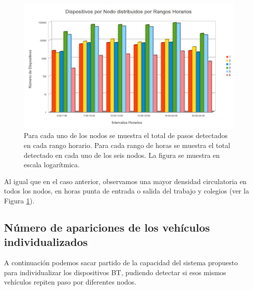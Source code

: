 \documentclass[twocolumn,twoside]{Jornadas}
\begin{document}
 \begin{figure}[htb]
 \begin{center}
 \includegraphics[scale=0.20]{VehiculosPorHoras.jpg}
 \caption{Para cada uno de los nodos se muestra el total de pasos detectados en cada rango horario. Para cada rango de horas se muestra el total detectado en cada uno de los seis nodos. La figura se muestra en escala logarítmica.
 \label{VehiculosPorHoras}}
 \end{center}
 \end{figure}
 
Al igual que en el caso anterior, observamos una mayor densidad circulatoria en todos los nodos, en horas punta de entrada o salida del trabajo y colegios (ver la Figura \ref{VehiculosPorHoras}).



\subsection{Número de apariciones de los vehículos individualizados}

A continuación podemos sacar partido de la capacidad del sistema propuesto para individualizar los dispositivos BT, pudiendo detectar si esos mismos 
vehículos repiten paso por diferentes nodos.
\end{document}

